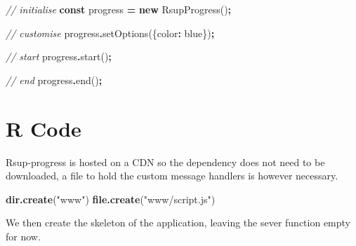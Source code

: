 \documentclass[
]{krantz}
\makeatletter
\newenvironment{Shaded}{\begin{snugshade}}{\end{snugshade}}
\newcommand{\CommentTok}[1]{\textcolor[rgb]{0.37,0.37,0.37}{\textit{#1}}}
\newcommand{\DataTypeTok}[1]{\textcolor[rgb]{0.27,0.27,0.27}{#1}}
\newcommand{\FunctionTok}[1]{\textcolor[rgb]{0,0,0}{#1}}
\newcommand{\KeywordTok}[1]{\textcolor[rgb]{0.27,0.27,0.27}{\textbf{#1}}}
\newcommand{\NormalTok}[1]{#1}
\newcommand{\OperatorTok}[1]{\textcolor[rgb]{0.43,0.43,0.43}{\textbf{#1}}}
\newcommand{\StringTok}[1]{\textcolor[rgb]{0.5,0.5,0.5}{#1}}
\newenvironment{kframe}{%
\medskip{}
\setlength{\fboxsep}{.8em}
 \def\at@end@of@kframe{}%
 \ifinner\ifhmode%
  \def\at@end@of@kframe{\end{minipage}}%
  \begin{minipage}{\columnwidth}%
 \fi\fi%
 \def\FrameCommand##1{\hskip\@totalleftmargin \hskip-\fboxsep
 \colorbox{shadecolor}{##1}\hskip-\fboxsep
     \hskip-\linewidth \hskip-\@totalleftmargin \hskip\columnwidth}%
 \MakeFramed {\advance\hsize-\width
   \@totalleftmargin\z@ \linewidth\hsize
   \@setminipage}}%
 {\par\unskip\endMakeFramed%
 \at@end@of@kframe}
\renewenvironment{Shaded}{\begin{kframe}}{\end{kframe}}
\makeatother
\begin{document}
\begin{Shaded}
\begin{Highlighting}[]
\CommentTok{// initialise}
\KeywordTok{const}\NormalTok{ progress }\OperatorTok{=} \KeywordTok{new}\NormalTok{ RsupProgress()}\OperatorTok{;}

\CommentTok{// customise}
\NormalTok{progress}\OperatorTok{.}\FunctionTok{setOptions}\NormalTok{(\{}\DataTypeTok{color}\OperatorTok{:} \StringTok{\textquotesingle{}blue\textquotesingle{}}\NormalTok{\})}\OperatorTok{;}

\CommentTok{// start}
\NormalTok{progress}\OperatorTok{.}\FunctionTok{start}\NormalTok{()}\OperatorTok{;}

\CommentTok{// end}
\NormalTok{progress}\OperatorTok{.}\FunctionTok{end}\NormalTok{()}\OperatorTok{;}
\end{Highlighting}
\end{Shaded}

\hypertarget{progress-r-code}{%
\section{R Code}\label{progress-r-code}}

Rsup-progress is hosted on a CDN so the dependency does not need to be downloaded, a file to hold the custom message handlers is however necessary.

\begin{Shaded}
\begin{Highlighting}[]
\KeywordTok{dir.create}\NormalTok{(}\StringTok{"www"}\NormalTok{)}
\KeywordTok{file.create}\NormalTok{(}\StringTok{"www/script.js"}\NormalTok{)}
\end{Highlighting}
\end{Shaded}

We then create the skeleton of the application, leaving the sever function empty for now.
\end{document}
